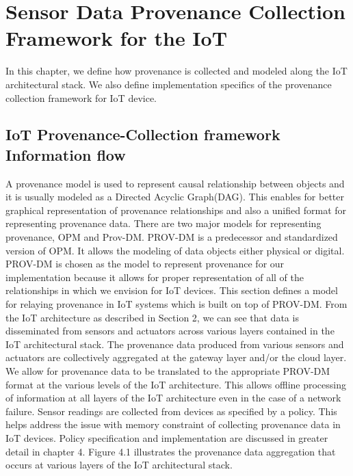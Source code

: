
\chapter{Sensor Data Provenance Collection Framework for the IoT}

In this chapter, we define how provenance is collected and modeled along the IoT architectural stack. We also define implementation specifics of the provenance collection framework for IoT device. 

\section{IoT Provenance-Collection framework Information flow}
%

A provenance model is used to represent causal relationship between objects and it is usually modeled as a Directed Acyclic Graph(DAG). This enables for better graphical representation of provenance relationships and also a unified format for representing provenance data. There are two major models for representing provenance, OPM and Prov-DM. PROV-DM is a predecessor and standardized version of OPM. It allows the modeling of data objects either physical or digital. PROV-DM is chosen as the model to represent provenance for our implementation because it allows for proper representation of all of the relationships in which we envision for IoT devices. This section defines a model for relaying provenance in IoT systems which is built on top of PROV-DM. 
From the IoT architecture as described in Section 2, we can see that data is disseminated from sensors and actuators across various layers contained in the IoT architectural stack. The provenance data produced from various sensors and actuators are collectively aggregated at the gateway layer and/or the cloud layer. We allow for provenance data to be translated to the appropriate PROV-DM format at the various levels of the IoT architecture. This allows offline processing of information at all layers of the IoT architecture even in the case of a network failure. Sensor readings are collected from devices as specified by a policy. This helps address the issue with memory constraint  of collecting provenance data in IoT devices. Policy specification and implementation are discussed in greater detail in chapter 4.  Figure 4.1 illustrates the provenance data aggregation that occurs at various layers of the IoT architectural stack.


